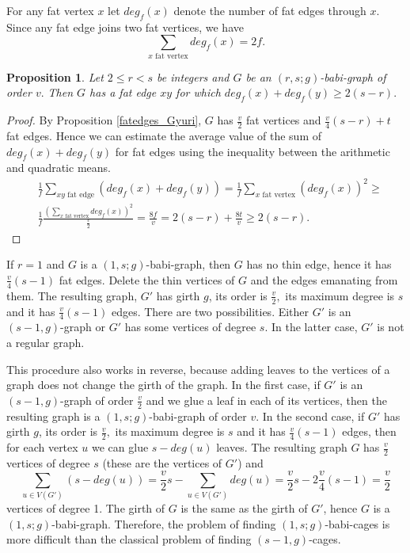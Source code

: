 \documentclass[a4paper,11pt]{article}
\newtheorem{proposition}[theorem]{Proposition}
\begin{document}
For any fat vertex $x$ let $deg_f(x)$ denote the number of fat edges through $x.$
Since any fat edge joins two fat vertices, we have 
$$\sum _{x \text{ fat vertex}}deg_f(x)=2f.$$

\begin{proposition}\label{fatedges-2_Gyuri}
Let $2\leq r<s$ be integers and $G$ be an $(r,s;g)$-babi-graph of order $v.$ 
Then $G$ has a fat edge $xy$ for which $deg_f(x)+deg_f(y)\geq 2(s-r).$
\end{proposition}

\begin{proof} 
By Proposition \ref{fatedges_Gyuri}, $G$ has $\frac{v}{2}$ fat vertices and  
$\frac{v}{4}(s-r)+t$ fat edges. 
Hence we can estimate the average value of the sum of $deg_f(x)+deg_f(y)$ for fat edges using the
inequality between the arithmetic and quadratic means.
\begin{equation}\label{average}
\begin{aligned}
 & \frac{1}{f}\sum _{xy \text{ fat edge}}(deg_f(x)+deg_f(y))=
\frac{1}{f}\sum _{x \text{ fat vertex}}(deg_f(x))^2 \geq \\ 
 &\frac{1}{f} \frac{(\sum _{x \text{ fat vertex}}deg_f(x))^2}{\frac{v}{2}}=\frac{8f}{v} 
=2(s-r)+\frac{8t}{v}\geq 2(s-r).
\end{aligned}
\end{equation}
\end{proof}


If $r=1$ and $G$ is a $(1,s;g)$-babi-graph, then $G$ has no thin edge, hence it has $\frac{v}{4}(s-1)$ fat edges. Delete the thin vertices of $G$ and the edges emanating from them. The resulting graph, $G'$ 
has girth $g$, its order is $\frac{v}{2},$ its maximum degree is $s$ and it has $\frac{v}{4}(s-1)$ edges.
There are two possibilities. Either $G'$ is an $(s-1,g)$-graph or $G'$ has some vertices of degree $s$. 
In the latter case, $G'$ is not a regular graph.

This procedure also works in reverse, because adding leaves to the vertices of a graph does not change the girth of the graph. In the first case, if $G'$ is an $(s-1,g)$-graph of order $\frac{v}{2}$ and we glue a leaf in each of its vertices, then the resulting graph is a $(1,s;g)$-babi-graph of order $v.$ 
In the second case, if $G'$ has girth $g$, its order is $\frac{v}{2},$ its maximum degree is $s$ and it has 
$\frac{v}{4}(s-1)$ edges, then for each vertex $u$ we can glue $s-deg(u)$ leaves. The resulting graph $G$
has $\frac{v}{2}$ vertices of degree $s$ (these are the vertices of $G'$) and 
$$\sum _{u\in V(G')}(s-deg(u))=\frac{v}{2}s-\sum _{u\in V(G')}deg(u)=
\frac{v}{2}s-2\frac{v}{4}(s-1)=\frac{v}{2}$$
vertices of degree 1. The girth of $G$ is the same as the girth of $G'$, hence $G$ is a $(1,s;g)$-babi-graph.
Therefore, the problem of finding $(1,s;g)$-babi-cages is more difficult than the classical problem
of finding $(s-1,g)$-cages.
\end{document}
